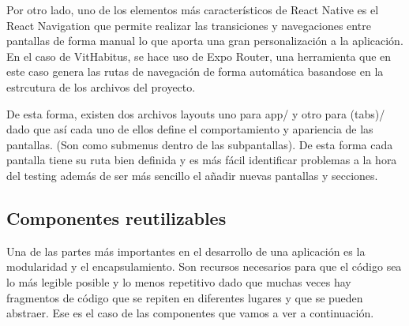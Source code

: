 Por otro lado, uno de los elementos más característicos de React Native es el React Navigation que permite realizar las transiciones y navegaciones entre pantallas de forma manual lo que aporta una gran personalización a la aplicación. En el caso de VitHabitus, se hace uso de Expo Router, una herramienta que en este caso genera las rutas de navegación de forma automática basandose en la estrcutura de los archivos del proyecto. 

De esta forma, existen dos archivos layouts uno para app/ y otro para (tabs)/ dado que así cada uno de ellos define el comportamiento y apariencia de las pantallas. (Son como submenus dentro de las subpantallas). De esta forma cada pantalla tiene su ruta bien definida y es más fácil identificar problemas a la hora del testing además de ser más sencillo el añadir nuevas pantallas y secciones.

\subsection{Componentes reutilizables}

Una de las partes más importantes en el desarrollo de una aplicación es la modularidad y el encapsulamiento. Son recursos necesarios para que el código sea lo más legible posible y lo menos repetitivo dado que muchas veces hay fragmentos de código que se repiten en diferentes lugares y que se pueden abstraer. Ese es el caso de las componentes que vamos a ver a continuación.

